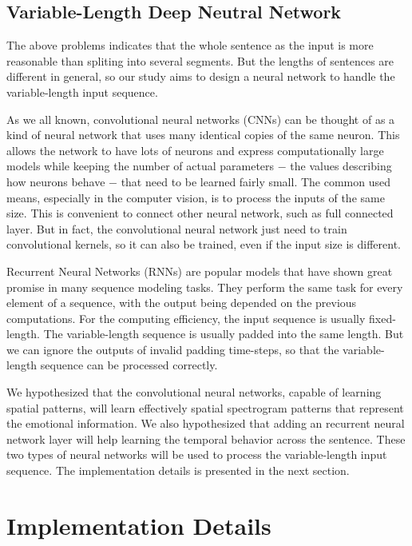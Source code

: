 \documentclass[a4paper]{article}
\begin{document}
\subsection{Variable-Length Deep Neutral Network}
\label{ssec:var_len_dnn}

The above problems indicates that the whole sentence as the input is more reasonable than spliting into several segments. But the lengths of sentences are different in general, so our study aims to design a neural network to handle the variable-length input sequence. 

As we all known, convolutional neural networks (CNNs) can be thought of as a kind of neural network that uses many identical copies of the same neuron. This allows the network to have lots of neurons and express computationally large models while keeping the number of actual parameters $-$ the values describing how neurons behave $-$ that need to be learned fairly small. The common used means, especially in the computer vision, is to process the inputs of the same size. This is convenient to connect other neural network, such as full connected layer. But in fact, the convolutional neural network just need to train convolutional kernels, so it can also be trained, even if the input size is different.

Recurrent Neural Networks (RNNs) are popular models that have shown great promise in many sequence modeling tasks. They perform the same task for every element of a sequence, with the output being depended on the previous computations. For the computing efficiency, the input sequence is usually fixed-length. The variable-length sequence is usually padded into the same length. But we can ignore the outputs of invalid padding time-steps, so that the variable-length sequence can be processed correctly.

We hypothesized that the convolutional neural networks, capable of learning spatial patterns, will learn effectively spatial spectrogram patterns that represent the emotional information. We also hypothesized that adding an recurrent neural network layer will help learning the temporal behavior across the sentence. These two types of neural networks will be used to process the variable-length input sequence. The implementation details is presented in the next section.  

\section{Implementation Details}
\label{sec:implementation_details}
\end{document}
